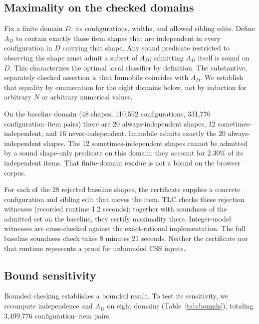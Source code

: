 \documentclass[acmsmall,screen,review,anonymous,nonacm]{acmart}
\begin{document}
\subsection{Maximality on the checked domains}
Fix a finite domain $D$, its configurations, widths, and allowed sibling edits. Define $A_D$ to contain exactly those item shapes that are independent in every configuration in $D$ carrying that shape. Any sound predicate restricted to observing the shape must admit a subset of $A_D$; admitting $A_D$ itself is sound on $D$. This characterizes the optimal local classifier by definition. The substantive, separately checked assertion is that $\mathrm{Immobile}$ coincides with $A_D$. We establish that equality by enumeration for the eight domains below, not by induction for arbitrary $N$ or arbitrary numerical values.

On the baseline domain (48 shapes, 110{,}592 configurations, 331{,}776 configuration--item pairs) there are 20 always-independent shapes, 12 sometimes-independent, and 16 never-independent. $\mathrm{Immobile}$ admits exactly the 20 always-independent shapes. The 12 sometimes-independent shapes cannot be admitted by a sound shape-only predicate on this domain; they account for 2.30\% of its independent items. That finite-domain residue is not a bound on the browser corpus.

For each of the 28 rejected baseline shapes, the certificate supplies a concrete configuration and sibling edit that moves the item. TLC checks these rejection witnesses (recorded runtime 1.2 seconds); together with soundness of the admitted set on the baseline, they certify maximality there. Integer-model witnesses are cross-checked against the exact-rational implementation. The full baseline soundness check takes 8 minutes 21 seconds. Neither the certificate nor that runtime represents a proof for unbounded CSS inputs.

\subsection{Bound sensitivity}
Bounded checking establishes a bounded result. To test its sensitivity, we recompute independence and $A_D$ on eight domains (Table~\ref{tab:bounds}), totaling 3{,}499{,}776 configuration--item pairs.
\end{document}
